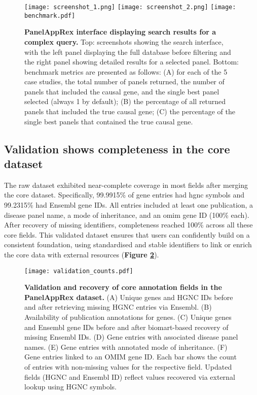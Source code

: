\begin{figure}[ht]
    \centering
    \texttt{[image: screenshot\_1.png]}
    \texttt{[image: screenshot\_2.png]}    
    \texttt{[image: benchmark.pdf]}    
\caption{\textbf{PanelAppRex interface displaying search results for a complex query.} Top: screenshots showing the search interface, with the left panel displaying the full database before filtering and the right panel showing detailed results for a selected panel. Bottom: benchmark metrics are presented as follows: (A) for each of the 5 case studies, the total number of panels returned, the number of panels that included the causal gene, and the single best panel selected (always 1 by default); (B) the percentage of all returned panels that included the true causal gene; (C) the percentage of the single best panels that contained the true causal gene.}
    \label{fig:performance}
\end{figure}

\subsection{Validation shows completeness in the core dataset}
\noindent
The raw dataset exhibited near-complete coverage in most fields after merging the core dataset. 
Specifically, 99.9915\% of gene entries had \ac{hgnc} symbols %
and 99.2315\% had Ensembl gene IDs. %
All entries included at least one publication, a disease panel name, a mode of inheritance, and an \ac{omim} gene ID (100\% each). 
After recovery of missing identifiers, completeness reached 100\% across all these core fields.
This validated dataset ensures that users can confidently build on a consistent foundation, using standardised and stable identifiers to link or enrich the core data with external resources (\textbf{Figure \ref{fig:validation}}).

\begin{figure}[ht]
    \centering
    \texttt{[image: validation\_counts.pdf]}
\caption{\textbf{Validation and recovery of core annotation fields in the PanelAppRex dataset.}
(A) Unique genes and HGNC IDs before and after retrieving missing HGNC entries via Ensembl.
(B) Availability of publication annotations for genes.
(C) Unique genes and Ensembl gene IDs before and after biomart-based recovery of missing Ensembl IDs.
(D) Gene entries with associated disease panel names.
(E) Gene entries with annotated mode of inheritance.
(F) Gene entries linked to an OMIM gene ID.
Each bar shows the count of entries with non-missing values for the respective field. Updated fields (HGNC and Ensembl ID) reflect values recovered via external lookup using HGNC symbols.
}
    \label{fig:validation}
\end{figure}

